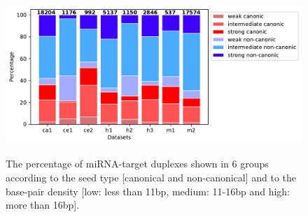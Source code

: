 \documentclass{bmcart}
\begin{document}
\begin{figure}[h!]
  \caption{ The percentage of miRNA-target duplexes shown in 6 groups according to the seed type [canonical and non-canonical] and to the base-pair density [low: less than 11bp, medium: 11-16bp and high: more than 16bp].}
    \includegraphics[width = 1\textwidth]{Results/seed_type_positive2.pdf}
      \label{fig:seed_type_pos}
      \end{figure}





\end{document}
